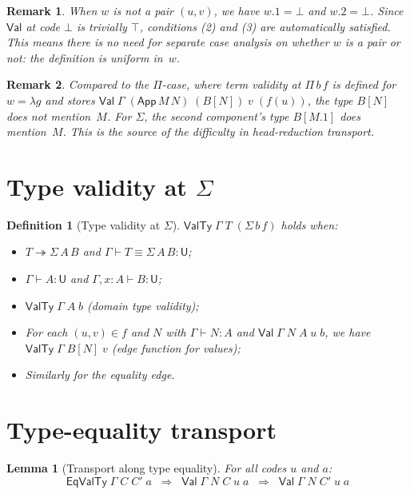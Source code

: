 \documentclass[11pt]{article}
\newcommand{\Type}{\mathsf{U}}
\newcommand{\Val}{\mathsf{Val}}
\newcommand{\ValTy}{\mathsf{ValTy}}
\newcommand{\EqValTy}{\mathsf{EqValTy}}
\newcommand{\HasType}{\vdash}
\newcommand{\ConvTm}{\equiv}
\newcommand{\HeadRed}{\twoheadrightarrow}
\newcommand{\App}{\mathsf{App}}
\newcommand{\Bot}{\bot}
\newcommand{\pj}[2]{#1\mbox{.}#2}
\newtheorem{definition}{Definition}
\newtheorem{lemma}{Lemma}
\newtheorem{remark}{Remark}
\begin{document}
\begin{remark}
When $w$ is not a pair $(u,v)$, we have $\pj{w}{1} = \Bot$ and
$\pj{w}{2} = \Bot$.  Since $\Val$ at code $\Bot$ is trivially $\top$,
conditions (2) and (3) are automatically satisfied.  This means there is no
need for separate case analysis on whether $w$ is a pair or not: the
definition is \emph{uniform} in~$w$.
\end{remark}

\begin{remark}
Compared to the $\Pi$-case, where term validity at $\Pi\,b\,f$ is
defined for $w = \lambda g$ and stores
$\Val\;\Gamma\;(\App\,M\,N)\;(B[N])\;v\;(f(u))$, the type $B[N]$ does not
mention~$M$.  For $\Sigma$, the second component's type $B[\pj{M}{1}]$
\emph{does} mention~$M$.  This is the source of the difficulty in
head-reduction transport.
\end{remark}

\section{Type validity at $\Sigma$}

\begin{definition}[Type validity at $\Sigma$]
$\ValTy\;\Gamma\;T\;(\Sigma\,b\,f)$ holds when:
\begin{itemize}
\item $T \HeadRed \Sigma\,A\,B$ and $\Gamma \HasType T \ConvTm \Sigma\,A\,B : \Type$;
\item $\Gamma \HasType A : \Type$ and $\Gamma,x\!:\!A \HasType B : \Type$;
\item $\ValTy\;\Gamma\;A\;b$ (domain type validity);
\item For each $(u,v) \in f$ and $N$ with $\Gamma \HasType N : A$ and
  $\Val\;\Gamma\;N\;A\;u\;b$, we have $\ValTy\;\Gamma\;B[N]\;v$ (edge
  function for values);
\item Similarly for the equality edge.
\end{itemize}
\end{definition}

\section{Type-equality transport}

\begin{lemma}[Transport along type equality]\label{lem:transport}
For all codes $u$ and $a$:
\[
  \EqValTy\;\Gamma\;C\;C'\;a \;\;\Longrightarrow\;\;
  \Val\;\Gamma\;N\;C\;u\;a \;\;\Longrightarrow\;\;
  \Val\;\Gamma\;N\;C'\;u\;a
\]
\end{lemma}
\end{document}

